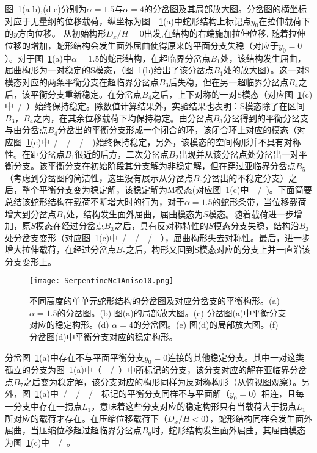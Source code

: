 图~\ref{fig:SerpentineNc1Aniso10}(a-b),(d-e)分别为$\alpha=1.5$与$\alpha=4$的分岔图及其局部放大图。分岔图的横坐标对应于无量纲的位移载荷，纵坐标为图~~\ref{fig:SerpentineNc1Aniso10}(a)中蛇形结构上标记点$y_0$在拉伸载荷下的$y$方向位移。
从初始构形$D_x/H=0$出发,在结构的右端施加拉伸位移, 随着拉伸位移的增加，蛇形结构会发生面外屈曲使得原来的平面分支失稳（对应于$y_0=0$）。对于图~\ref{fig:SerpentineNc1Aniso10}(a)中$\alpha=1.5$的蛇形结构，在超临界分岔点$B_1$处，该结构发生屈曲，屈曲构形为一对稳定的S模态，（图~\ref{fig:SerpentineNc1Aniso10}(b)给出了该分岔点$B_1$处的放大图）。这一对S模态对应的两条平衡分支在超临界分岔点$B_3$后失稳，但在另一超临界分岔点$B_4$之后，该平衡分支重新稳定。在分岔点$B_4$之后，上下对称的一对S模态（对应图~\ref{fig:SerpentineNc1Aniso10}(c)中\bluesquare~/~\redsquare）始终保持稳定。除数值计算结果外，实验结果也表明：S模态除了在区间$B_3$，$B_4$之内，在其余位移载荷下均保持稳定。由分岔点$B_3$分岔得到的平衡分岔支与由分岔点$B_4$分岔出的平衡分支形成一个闭合的环，该闭合环上对应的模态（对应图~\ref{fig:SerpentineNc1Aniso10}(c)中\Brighttriangle~/~\Rrighttriangle~/~\Blefttriangle~/~\Rlefttriangle~)始终保持稳定，另外，该模态的空间构形并不具有对称性。在距分岔点$B_1$很近的后方，二次分岔点$B_2$出现并从该分岔点处分岔出一对平衡分支。该平衡分支在初始阶段其分支解为非稳定解，但在穿过亚临界分岔点$B_5$（考虑到分岔图的简洁性，这里没有展示从分岔点$B_5$分岔出的不稳定分支）之后，整个平衡分支变为稳定解，该稳定解为M模态(对应图~\ref{fig:SerpentineNc1Aniso10}(c)中~\Btriangle~/~\Rtriangle)。下面简要总结该蛇形结构在载荷不断增大时的行为，对于$\alpha=1.5$的蛇形条带，当位移载荷增大到分岔点$B_1$处，结构发生面外屈曲，屈曲模态为$S$模态。随着载荷进一步增加，原$S$模态在经过分岔点$B_3$之后，具有反对称特性的$S$模态分支失稳，结构沿$B_3$处分岔支变形（对应图~\ref{fig:SerpentineNc1Aniso10}(c)中\Brighttriangle~/~\Rrighttriangle~/~\Blefttriangle~/~\Rlefttriangle~），屈曲构形失去对称性。最后，进一步增大拉伸载荷，在经过分岔点$B_5$之后，构形又回到S模态对应的分支上并一直沿该分支变形上。
\begin{figure}[t]
	\centering
	\texttt{[image: SerpentineNc1Aniso10.png]}
	\caption{不同高度的单单元蛇形结构的分岔图及对应分岔支的平衡构形。(a) $\alpha=1.5$的分岔图。(b) 图(a)的局部放大图。(c) 分岔图(a)中平衡分支对应的稳定构形。(d)  $\alpha=4$的分岔图。(e) 图(d)的局部放大图。(f) 分岔图(d)中平衡分支对应的稳定构形。}
	\label{fig:SerpentineNc1Aniso10}
\end{figure}

分岔图~\ref{fig:SerpentineNc1Aniso10}(a)中存在不与平面平衡分支$y_0=0$连接的其他稳定分支。其中一对这类孤立的分支为图~\ref{fig:SerpentineNc1Aniso10}(a)中（~\Rdiamond~/~\Bdiamond）中所标记的分支，该分支对应的解在亚临界分岔点$B_7$之后变为稳定解，该分支对应的构形同样为反对称构形（从俯视图观察）。另外，图~\ref{fig:SerpentineNc1Aniso10}(a)中\HBrighttriangle~/~\HRrighttriangle~/~\HBlefttriangle~/~\HRlefttriangle~标记的平衡分支同样不与平面解（$y_0=0$）相连，且每一分支中存在一拐点$L_1$，意味着这些分支对应的稳定构形只有当载荷大于拐点$L_1$所对应的载荷才存在。在压缩位移载荷下（$D_x/H<0$），蛇形结构同样会发生面外屈曲，当压缩位移超过超临界分岔点$B_6$时，蛇形结构发生面外屈曲，其屈曲模态为图~\ref{fig:SerpentineNc1Aniso10}(c)中~\Bstarshape~/~\Rstarshape。


